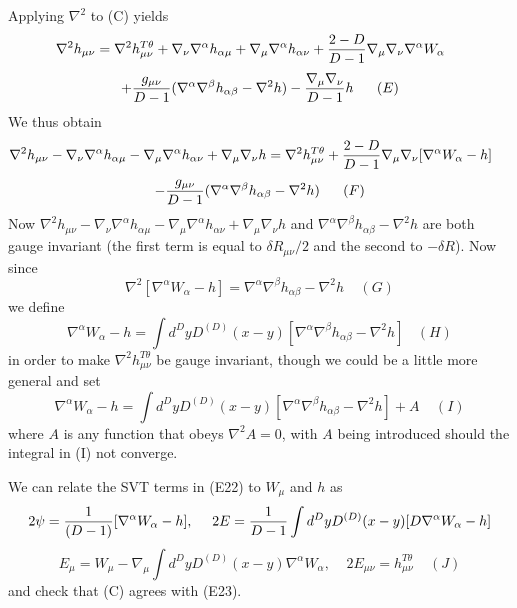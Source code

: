 \documentclass[10pt,letterpaper]{article}
\numberwithin{equation}{section}
\begin{document}
Applying $\nabla^2$ to (C) yields
%
$$\nabla^2h_{\mu\nu}=\nabla^2h_{\mu\nu}^{T\theta}+\nabla_{\nu}\nabla^{\alpha}h_{\alpha\mu}+\nabla_{\mu}\nabla^{\alpha}h_{\alpha\nu}+{2-D \over D-1}\nabla_{\mu}\nabla_{\nu}\nabla^{\alpha}W_{\alpha}~~~~$$
%
$$+{g_{\mu\nu}\over D-1}(\nabla^{\alpha}\nabla^{\beta}h_{\alpha\beta}-\nabla^2h)-{\nabla_{\mu}\nabla_{\nu} \over D-1}h~~~~~(E)$$
%
We thus obtain
%
$$\nabla^2h_{\mu\nu}-\nabla_{\nu}\nabla^{\alpha}h_{\alpha\mu}-\nabla_{\mu}\nabla^{\alpha}h_{\alpha\nu}+\nabla_{\mu}\nabla_{\nu}h=\nabla^2h_{\mu\nu}^{T\theta}+{2-D \over D-1}\nabla_{\mu}\nabla_{\nu}[\nabla^{\alpha}W_{\alpha}-h]~~~~$$
%
$$-{g_{\mu\nu}\over D-1}(\nabla^{\alpha}\nabla^{\beta}h_{\alpha\beta}-\nabla^2h)~~~~~(F)$$
%
Now $\nabla^2h_{\mu\nu}-\nabla_{\nu}\nabla^{\alpha}h_{\alpha\mu}-\nabla_{\mu}\nabla^{\alpha}h_{\alpha\nu}+\nabla_{\mu}\nabla_{\nu}h$ and $\nabla^{\alpha}\nabla^{\beta}h_{\alpha\beta}-\nabla^2h$ are both gauge invariant (the first term is equal to $\delta R_{\mu\nu}/2$ and the second to $-\delta R$). Now since
%
$$\nabla^2[\nabla^{\alpha}W_{\alpha}-h]=\nabla^{\alpha}\nabla^{\beta}h_{\alpha\beta}-\nabla^2h~~~~~(G)$$
%
we define
%
$$\nabla^{\alpha}W_{\alpha}-h=\int d^DyD^{(D)}(x-y)[\nabla^{\alpha}\nabla^{\beta}h_{\alpha\beta}-\nabla^2h]~~~~(H)$$
%
in order to make  $\nabla^2h_{\mu\nu}^{T\theta}$ be gauge invariant, though we could be a little more general and set
%
$$\nabla^{\alpha}W_{\alpha}-h=\int d^DyD^{(D)}(x-y)[\nabla^{\alpha}\nabla^{\beta}h_{\alpha\beta}-\nabla^2h]+A~~~~~(I)$$
%
where $A$ is any function that obeys $\nabla^2A=0$, with $A$ being introduced should the integral in (I) not converge.

We can relate the SVT terms in (E22) to $W_{\mu}$ and $h$ as
%
$$2\psi={1 \over (D-1)}[\nabla^{\alpha}W_{\alpha}-h],~~~~2E={1 \over D-1}\int d^DyD^{(D)}(x-y)[D\nabla^{\alpha}W_{\alpha}-h]$$
$$E_{\mu}=W_{\mu}-\nabla_{\mu}\int d^DyD^{(D)}(x-y)\nabla^{\alpha}W_{\alpha},~~~~~2E_{\mu\nu}=h_{\mu\nu}^{T\theta}~~~~~(J)$$
%
and check that (C) agrees with  (E23).
\end{document}
